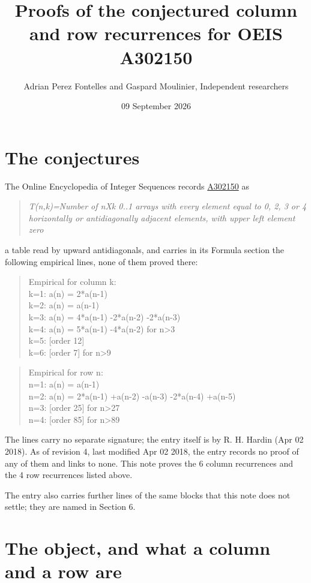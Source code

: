 \documentclass[11pt]{article}
\title{Proofs of the conjectured column and row recurrences for OEIS A302150}
\author{Adrian Perez Fontelles and Gaspard Moulinier, Independent researchers}
\date{09 September 2026}
\theoremstyle{definition}
\begin{document}
\maketitle
\section{The conjectures}

The Online Encyclopedia of Integer Sequences records \href{https://oeis.org/A302150}{A302150} as

\begin{quote}\itshape T(n,k)=Number of nXk 0..1 arrays with every element equal to 0, 2, 3 or 4 horizontally or antidiagonally adjacent elements, with upper left element zero\end{quote}

a table read by upward antidiagonals, and carries in its Formula section the following empirical lines, none of them proved there:

\begin{quote}\ttfamily Empirical for column k:\\
k=1: a(n) = 2*a(n-1)\\k=2: a(n) = a(n-1)\\k=3: a(n) = 4*a(n-1) -2*a(n-2) -2*a(n-3)\\k=4: a(n) = 5*a(n-1) -4*a(n-2) for n>3\\k=5: [order 12]\\k=6: [order 7] for n>9\end{quote}

\begin{quote}\ttfamily Empirical for row n:\\
n=1: a(n) = a(n-1)\\n=2: a(n) = 2*a(n-1) +a(n-2) -a(n-3) -2*a(n-4) +a(n-5)\\n=3: [order 25] for n>27\\n=4: [order 85] for n>89\end{quote}

The lines carry no separate signature; the entry itself is by R. H. Hardin (Apr 02 2018). As of revision 4, last modified Apr 02 2018, the entry records no proof of any of them and links to none. This note proves the 6 column recurrences and the 4 row recurrences listed above.

The entry also carries further lines of the same blocks that this note does not settle; they are named in Section 6.

\section{The object, and what a column and a row are}
\end{document}
